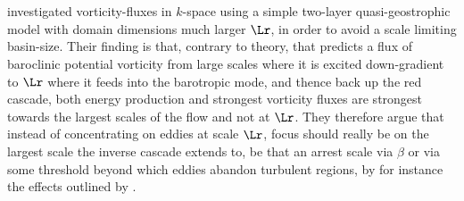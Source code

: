 



\section*{\citealt{larichev1995eddy}}\label{sec:hist_lari95}
\citeauthor{larichev1995eddy} investigated vorticity-fluxes in $k$-space  using a simple two-layer quasi-geostrophic model with domain dimensions much larger $\Lr$, in order to avoid a scale limiting basin-size. Their finding is that, contrary to theory, that predicts a flux of baroclinic potential vorticity from large scales where it is excited down-gradient to $\Lr$ where it feeds into the barotropic mode, and thence back up the red cascade, both energy production and strongest vorticity fluxes are strongest towards the largest scales of the flow and not at $\Lr$. They therefore argue that instead of concentrating on eddies at scale $\Lr$, focus should really be on the largest scale the inverse cascade extends to, be that an arrest scale via $\beta$ or via some threshold beyond which eddies abandon turbulent regions, by for instance the effects outlined by \cite{Cushman-Roisin1990}.



